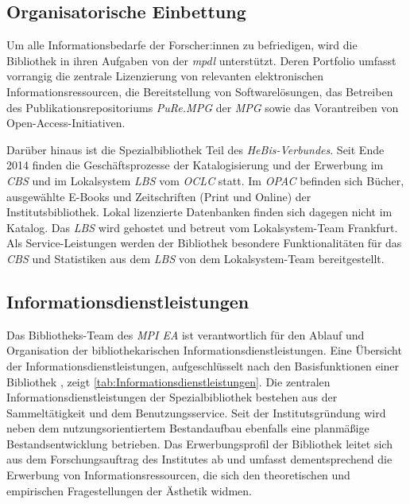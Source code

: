 \subsection{Organisatorische Einbettung}
Um alle Informationsbedarfe der Forscher:innen zu befriedigen, wird die Bibliothek in ihren Aufgaben von der
\textit{\acrlong{mpdl}} unterstützt. Deren Portfolio umfasst vorrangig die zentrale 
Lizenzierung von relevanten elektronischen Informationsressourcen, die Bereitstellung von Softwarelösungen, 
das Betreiben des Publikationsrepositoriums \textit{\acrshort{PuRe.MPG}} der \textit{\acrfull{MPG}} sowie
das Vorantreiben von Open-Access-Initiativen. 

Darüber hinaus ist die Spezialbibliothek Teil des \textit{\acrshort{HeBis}-Verbundes}. 
Seit Ende 2014 finden die Geschäftsprozesse der Katalogisierung und der Erwerbung im \textit{\acrfull{CBS}} und 
im Lokalsystem \textit{\acrfull{LBS}} vom \textit{\acrshort{OCLC}} statt. Im \textit{\acrfull{OPAC}} befinden sich Bücher, ausgewählte E-Books 
und Zeitschriften (Print und Online) der Institutsbibliothek. Lokal lizenzierte Datenbanken finden sich dagegen
nicht im Katalog. Das \textit{\acrshort{LBS}} wird gehostet und betreut 
vom Lokalsystem-Team Frankfurt. Als Service-Leistungen werden der Bibliothek besondere Funktionalitäten 
für das \textit{\acrlong{CBS}} und Statistiken aus dem \textit{\acrshort{LBS}} von dem Lokalsystem-Team bereitgestellt.


\subsection{Informationsdienstleistungen}
Das Bibliotheks-Team des \textit{\acrshort{MPI EA}} ist verantwortlich für den Ablauf und Organisation der bibliothekarischen 
Informationsdienstleistungen. Eine Übersicht der Informationsdienstleistungen,
aufgeschlüsselt nach den Basisfunktionen einer Bibliothek \cite[S. 204 f.]{rosch_bibliotheken_2019}, zeigt \autoref{tab:Informationsdienstleistungen}. 
Die zentralen Informationsdienstleistungen der Spezialbibliothek bestehen aus der Sammeltätigkeit und dem Benutzungsservice.
Seit der Institutsgründung wird neben dem nutzungsorientiertem Bestandaufbau ebenfalls eine planmäßige 
Bestandsentwicklung betrieben. Das Erwerbungsprofil der Bibliothek leitet sich aus dem Forschungsauftrag des Institutes 
ab und umfasst dementsprechend die Erwerbung von Informationsressourcen, die sich den theoretischen und 
empirischen Fragestellungen der Ästhetik widmen.



